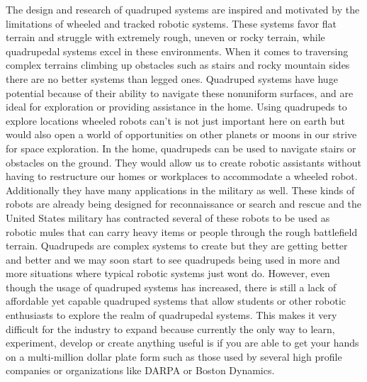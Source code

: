 
    
The design and research of quadruped systems are inspired and motivated by the limitations of wheeled and tracked robotic systems. These systems favor flat terrain and struggle with extremely rough, uneven or rocky terrain, while quadrupedal systems excel in these environments. When it comes to traversing complex terrains climbing up obstacles such as stairs and rocky mountain sides there are no better systems than legged ones. Quadruped systems have huge potential because of their ability to navigate these nonuniform surfaces, and are ideal for exploration or providing assistance in the home. Using quadrupeds to explore locations wheeled robots can't is not just important here on earth but would also open a world of opportunities on other planets or moons in our strive for space exploration. In the home, quadrupeds can be used to navigate stairs or obstacles on the ground. They would allow us to create robotic assistants without having to restructure our homes or workplaces to accommodate a wheeled robot. Additionally they have many applications in the military as well. These kinds of robots are already being designed for reconnaissance or search and rescue and the United States military has contracted several of these robots to be used as robotic mules that can carry heavy items or people through the rough battlefield terrain. Quadrupeds are complex systems to create but they are getting better and better and we may soon start to see quadrupeds being used in more and more situations where typical robotic systems just wont do. However, even though the usage of quadruped systems has increased, there is still a lack of affordable yet capable quadruped systems that allow students or other robotic enthusiasts to explore the realm of quadrupedal systems. This makes it very difficult for the industry to expand because currently the only way to learn, experiment, develop or create anything useful is if you are able to get your hands on a multi-million dollar plate form such as those used by several high profile companies or organizations like DARPA or Boston Dynamics. 

